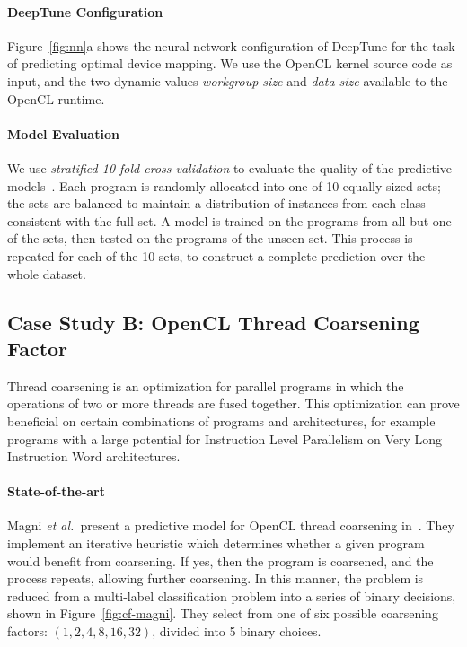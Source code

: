 \paragraph{DeepTune Configuration} Figure~\ref{fig:nn}a shows the neural network configuration of DeepTune for the task of predicting optimal device mapping. We use the OpenCL kernel source code as input, and the two dynamic values \emph{workgroup size} and \emph{data size} available to the OpenCL runtime.

\paragraph{Model Evaluation} We use \emph{stratified 10-fold cross-validation} to evaluate the quality of the predictive models~\cite{Han2011}. Each program is randomly allocated into one of 10 equally-sized sets; the sets are balanced to maintain a distribution of instances from each class consistent with the full set. A model is trained on the programs from all but one of the sets, then tested on the programs of the unseen set. This process is repeated for each of the 10 sets, to construct a complete prediction over the whole dataset.






\subsection{Case Study B: OpenCL Thread Coarsening Factor} \label{subsec:case-study-b}



Thread coarsening is an optimization for parallel programs in which the operations of two or more threads are fused together. This optimization can prove beneficial on certain combinations of programs and architectures, for example programs with a large potential for Instruction Level Parallelism on Very Long Instruction Word architectures.

\paragraph{State-of-the-art} Magni \emph{et al.\ }present a predictive model for OpenCL thread coarsening in~\cite{Magni2014}. They implement an iterative heuristic which determines whether a given program would benefit from coarsening. If yes, then the program is coarsened, and the process repeats, allowing further coarsening. In this manner, the problem is reduced from a multi-label classification problem into a series of binary decisions, shown in Figure~\ref{fig:cf-magni}. They select from one of six possible coarsening factors: $(1, 2, 4, 8, 16, 32)$, divided into 5 binary choices.

